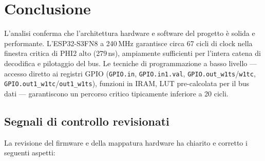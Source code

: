 \documentclass[12pt, a4paper]{article}
\begin{document}
\section{Conclusione}
L'analisi conferma che l'architettura hardware e software del progetto è solida e performante. L'ESP32-S3FN8 a 240\,MHz garantisce circa 67 cicli di clock nella finestra critica di PHI2 alto (279\,ns), ampiamente sufficienti per l'intera catena di decodifica e pilotaggio del bus. Le tecniche di programmazione a basso livello — accesso diretto ai registri GPIO (\texttt{GPIO.in}, \texttt{GPIO.in1.val}, \texttt{GPIO.out\_w1ts}/\texttt{w1tc}, \texttt{GPIO.out1\_w1tc}/\texttt{out1\_w1ts}), funzioni in IRAM, LUT pre-calcolata per il bus dati — garantiscono un percorso critico tipicamente inferiore a 20 cicli.

\subsection*{Segnali di controllo revisionati}
La revisione del firmware e della mappatura hardware ha chiarito e corretto i seguenti aspetti:
\end{document}
